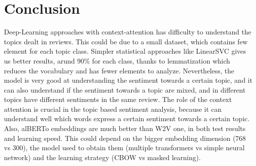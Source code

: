 \documentclass{article}
\begin{document}
    \section{Conclusion}\label{sec:s6}
        Deep-Learning approaches with context-attention has difficulty to understand the topics dealt in reviews.
        This could be due to a small dataset, which contains few element for each topic class.
        Simpler statistical approaches like LinearSVC gives us better results, arund 90\% for each class, thanks to lemmatization which reduces the vocabulary and has fewer elements to analyze.
        Nevertheless, the model is very good at understanding the sentiment towards a certain topic, and it can also understand if the sentiment towards a topic are mixed, and in different topics have different sentiments in the same review.
        The role of the context attention is crucial in the topic based sentiment analysis, because it can understand well which words express a certain sentiment towards a certain topic.
        Also, alBERTo embeddings are much better than W2V one, in both test results and learning speed.
        This could depend on the bigger embedding dimension (768 vs 300), the model used to obtain them (multiple transformers vs simple neural network) and the learning strategy (CBOW vs masked learning).
\end{document}
